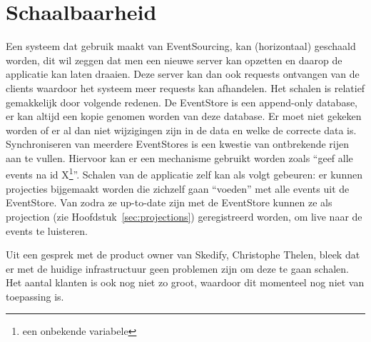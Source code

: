 
\chapter{Schaalbaarheid}
\label{ch:schaalbaarheid}

Een systeem dat gebruik maakt van EventSourcing, kan (horizontaal) geschaald worden, dit wil zeggen dat men een nieuwe server kan opzetten en daarop de applicatie kan laten draaien. Deze server kan dan ook \glspl{request} ontvangen van de clients waardoor het systeem meer \glspl{request} kan afhandelen. Het schalen is relatief gemakkelijk door volgende redenen.
De EventStore is een append-only database, er kan altijd een kopie genomen worden van deze database. Er moet niet gekeken worden of er al dan niet wijzigingen zijn in de data en welke de correcte data is. Synchroniseren van meerdere EventStores is een kwestie van ontbrekende rijen aan te vullen. Hiervoor kan er een mechanisme gebruikt worden zoals ``geef alle events na id X\footnote{een onbekende variabele}''.
Schalen van de applicatie zelf kan als volgt gebeuren: er kunnen projecties bijgemaakt worden die zichzelf gaan ``voeden'' met alle events uit de EventStore. Van zodra ze up-to-date zijn met de EventStore kunnen ze als projection (zie Hoofdstuk~\ref{sec:projections}) geregistreerd worden, om live naar de events te luisteren.

Uit een gesprek met de product owner van Skedify, Christophe Thelen, bleek dat er met de huidige infrastructuur geen problemen zijn om deze te gaan schalen. Het aantal klanten is ook nog niet zo groot, waardoor dit momenteel nog niet van toepassing is.